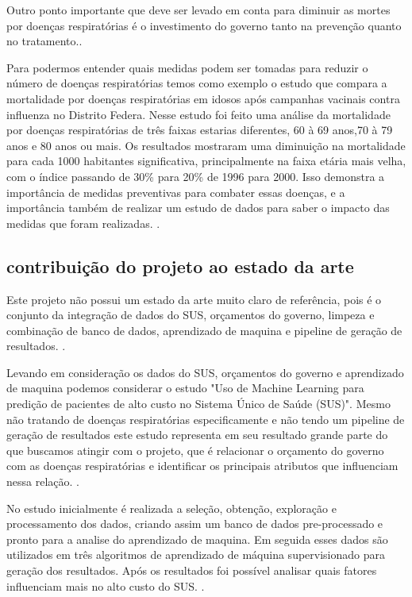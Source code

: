 \documentclass[journal]{IEEEtran}
\begin{document}
Outro ponto importante que deve ser levado em conta para diminuir as mortes por doenças respiratórias é o investimento do governo tanto na prevenção quanto no tratamento.\cite{mudanças}.

Para podermos entender quais medidas podem ser tomadas para reduzir o número de doenças respiratórias temos como exemplo o estudo que compara a mortalidade por doenças respiratórias em idosos após campanhas vacinais contra influenza no Distrito Federa. Nesse estudo foi feito uma análise da mortalidade por doenças respiratórias de três faixas estarias diferentes, 60 à 69 anos,70 à 79 anos e 80 anos ou mais. Os resultados mostraram uma diminuição na mortalidade para cada 1000 habitantes significativa, principalmente na faixa etária mais velha, com o índice passando de 30\% para 20\% de 1996 para 2000. Isso demonstra a importância de medidas preventivas para combater essas doenças, e a importância também de realizar um estudo de dados para saber o impacto das medidas que foram realizadas.     \cite{mudanças}.


\subsection{contribuição do projeto ao estado da arte}
Este projeto não possui um estado da arte muito claro de referência, pois é o conjunto da integração de dados do SUS, orçamentos do governo, limpeza e combinação de banco de dados, aprendizado de maquina e pipeline de geração de resultados. \cite{mudanças}.

Levando em consideração os dados do SUS, orçamentos do governo e aprendizado de maquina podemos considerar o estudo "Uso de Machine Learning para predição de pacientes de alto custo no Sistema Único de Saúde (SUS)". Mesmo não tratando de doenças respiratórias especificamente e não tendo um pipeline de geração de resultados este estudo representa em seu resultado grande parte do que buscamos atingir com o projeto, que é relacionar o orçamento do governo com as doenças respiratórias e identificar os principais atributos que influenciam nessa relação. \cite{mudanças}.

No estudo inicialmente é realizada a seleção, obtenção, exploração e processamento dos dados, criando assim um banco de dados pre-processado e pronto para a analise do aprendizado de maquina. Em seguida esses dados são utilizados em três algoritmos de aprendizado de máquina supervisionado para geração dos resultados. Após os resultados foi possível analisar quais fatores influenciam mais no alto custo do SUS.   \cite{mudanças}.
\end{document}
